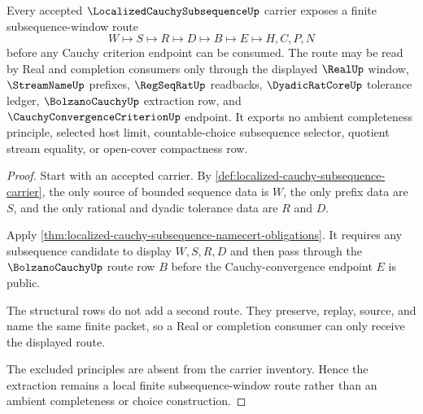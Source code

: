 \begin{theorem}
\label{thm:localized-cauchy-subsequence-window-extraction}
Every accepted $\LocalizedCauchySubsequenceUp$ carrier exposes a finite subsequence-window route
$$
W \longmapsto S \longmapsto R \longmapsto D \longmapsto B \longmapsto E \longmapsto H,C,P,N
$$
before any Cauchy criterion endpoint can be consumed. The route may be read by Real and completion consumers only through the displayed $\RealUp$ window, $\StreamNameUp$ prefixes, $\RegSeqRatUp$ readbacks, $\DyadicRatCoreUp$ tolerance ledger, $\BolzanoCauchyUp$ extraction row, and $\CauchyConvergenceCriterionUp$ endpoint. It exports no ambient completeness principle, selected host limit, countable-choice subsequence selector, quotient stream equality, or open-cover compactness row.
\end{theorem}
\begin{proof}
Start with an accepted carrier. By \autoref{def:localized-cauchy-subsequence-carrier}, the only source of bounded sequence data is $W$, the only prefix data are $S$, and the only rational and dyadic tolerance data are $R$ and $D$.

Apply \autoref{thm:localized-cauchy-subsequence-namecert-obligations}. It requires any subsequence candidate to display $W,S,R,D$ and then pass through the $\BolzanoCauchyUp$ route row $B$ before the Cauchy-convergence endpoint $E$ is public.

The structural rows do not add a second route. They preserve, replay, source, and name the same finite packet, so a Real or completion consumer can only receive the displayed route.

The excluded principles are absent from the carrier inventory. Hence the extraction remains a local finite subsequence-window route rather than an ambient completeness or choice construction.
\end{proof}



